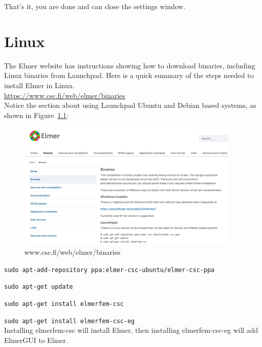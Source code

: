 That's it, you are done and can close the settings window.


\chapter{Linux}

The Elmer website has instructions showing how to download binaries, including Linux binaries from Launchpad.  Here is a quick summary of the steps needed to install Elmer in Linux.\\

 \url{https://www.csc.fi/web/elmer/binaries}\\

Notice the section about using Launchpad Ubuntu and Debian based systems, as shown in Figure~\ref{fg:binaries}:\\

\begin{figure}[H]
\begin{center}
\includegraphics[width=0.95\textwidth]{binaries}
\caption{www.csc.fi/web/elmer/binaries}\label{fg:binaries}
\end{center}
\end{figure}


\texttt{sudo apt-add-repository ppa:elmer-csc-ubuntu/elmer-csc-ppa}

\texttt{sudo apt-get update}

\texttt{sudo apt-get install elmerfem-csc}

\texttt{sudo apt-get install elmerfem-csc-eg}\\

Installing elmerfem-csc will install Elmer, then installing elmerfem-csc-eg will add ElmerGUI to Elmer.\\

